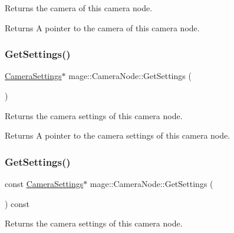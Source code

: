 Returns the camera of this camera node.

\begin{DoxyReturn}{Returns}
A pointer to the camera of this camera node. 
\end{DoxyReturn}
\hypertarget{classmage_1_1_camera_node_a0bd616c44db36301845b02a03f1db5ba}{}\label{classmage_1_1_camera_node_a0bd616c44db36301845b02a03f1db5ba} 
\subsubsection{\texorpdfstring{Get\+Settings()}{GetSettings()}\hspace{0.1cm}{\footnotesize\ttfamily [1/2]}}
{\footnotesize\ttfamily \hyperlink{structmage_1_1_camera_settings}{Camera\+Settings}$\ast$ mage\+::\+Camera\+Node\+::\+Get\+Settings (\begin{DoxyParamCaption}{ }\end{DoxyParamCaption})\hspace{0.3cm}{\ttfamily [noexcept]}}

Returns the camera settings of this camera node.

\begin{DoxyReturn}{Returns}
A pointer to the camera settings of this camera node. 
\end{DoxyReturn}
\hypertarget{classmage_1_1_camera_node_a1098f7929715018978b1bb8ac00c7148}{}\label{classmage_1_1_camera_node_a1098f7929715018978b1bb8ac00c7148} 
\subsubsection{\texorpdfstring{Get\+Settings()}{GetSettings()}\hspace{0.1cm}{\footnotesize\ttfamily [2/2]}}
{\footnotesize\ttfamily const \hyperlink{structmage_1_1_camera_settings}{Camera\+Settings}$\ast$ mage\+::\+Camera\+Node\+::\+Get\+Settings (\begin{DoxyParamCaption}{ }\end{DoxyParamCaption}) const\hspace{0.3cm}{\ttfamily [noexcept]}}

Returns the camera settings of this camera node.

